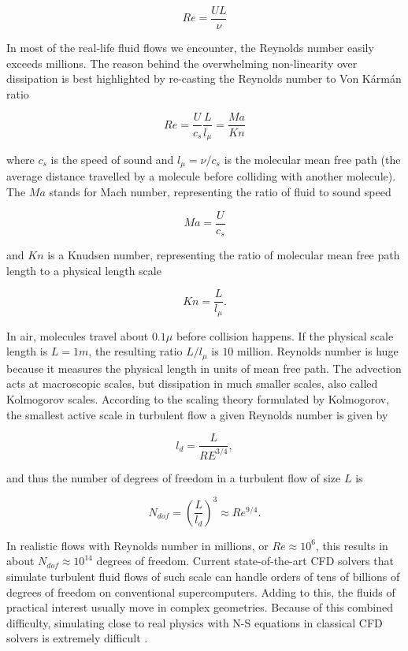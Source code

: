 \begin{equation}
Re = \frac{UL}{\nu}
\end{equation}

In most of the real-life fluid flows we encounter, the Reynolds number easily exceeds millions. The reason behind the overwhelming non-linearity over dissipation is best highlighted by re-casting the Reynolds number to Von Kármán ratio

\begin{equation}
	Re = \frac{U}{c_s} \frac{L}{l_\mu} = \frac{Ma}{Kn}
\end{equation}

where $c_s$ is the speed of sound and $l_\mu = \nu / c_s$ is the molecular mean free path (the average distance travelled by a molecule before colliding with another molecule). The $Ma$ stands for Mach number, representing the ratio of fluid to sound speed

\begin{equation}
	Ma = \frac{U}{c_s}
\end{equation}

and $Kn$ is a Knudsen number, representing the ratio of molecular mean free path length to a physical length scale

\begin{equation}
	Kn = \frac{L}{l_\mu}.
\end{equation}

In air, molecules travel about $0.1\mu$ before collision happens. If the physical scale length is $L = 1m$, the resulting ratio $L/l_\mu$ is $10$ million. Reynolds number is huge because it measures the physical length in units of mean free path. The advection acts at macroscopic scales, but dissipation in much smaller scales, also called Kolmogorov scales. According to the scaling theory formulated by Kolmogorov, the smallest active scale in turbulent flow a given Reynolds number is given by

\begin{equation}
	l_d = \frac{L}{RE^{3/4}},
\end{equation}

and thus the number of degrees of freedom in a turbulent flow of size $L$ is

\begin{equation}
	N_{dof} = \left(\frac{L}{l_d}\right)^3 \approx Re^{9/4}.
\end{equation}

In realistic flows with Reynolds number in millions, or $Re \approx 10^6$, this results in about $N_{dof} \approx 10^{14}$ degrees of freedom. Current state-of-the-art CFD solvers that simulate turbulent fluid flows of such scale can handle orders of tens of billions of degrees of freedom on conventional supercomputers. Adding to this, the fluids of practical interest usually move in complex geometries. Because of this combined difficulty, simulating close to real physics with N-S equations in classical CFD solvers is extremely difficult \citep{succi2018}.

